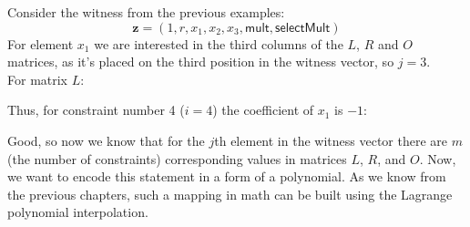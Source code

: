 \documentclass[../lecture-notes-148x210.tex]{subfiles}
\begin{document}
\begin{example}
    Consider the witness from the previous examples: 
    \begin{equation*}
        \mathbf{z} = (1, r, x_1, x_2, x_3, \mathsf{mult}, \mathsf{selectMult})
    \end{equation*}
    For element $x_1$ we are interested in the third columns of the $L$, $R$ and $O$ matrices, as
    it's placed on the third position in the witness vector, so $j = 3$.\\
    For matrix $L$:
    \begin{center}
    \end{center}

    Thus, for constraint number 4 ($i = 4$) the coefficient of $x_1$ is $-1$:
    \begin{center}
    \end{center}
\end{example}
Good, so now we know that for the $j$th element in the witness vector there are $m$ (the number of constraints) corresponding values in matrices $L$, $R$, and $O$. Now, we want to encode this statement in a form of a polynomial. 
As we know from the previous chapters, such a mapping in math can be built using the Lagrange polynomial interpolation.
\end{document}
